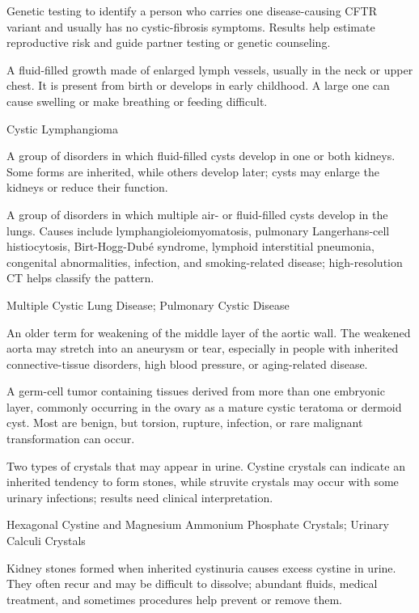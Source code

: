  Genetic testing to identify a person who carries one disease-causing CFTR variant and usually has no cystic-fibrosis symptoms. Results help estimate reproductive risk and guide partner testing or genetic counseling.

 A fluid-filled growth made of enlarged lymph vessels, usually in the neck or upper chest. It is present from birth or develops in early childhood. A large one can cause swelling or make breathing or feeding difficult.

\synonyms
Cystic Lymphangioma

 A group of disorders in which fluid-filled cysts develop in one or both kidneys. Some forms are inherited, while others develop later; cysts may enlarge the kidneys or reduce their function.

 A group of disorders in which multiple air- or fluid-filled cysts develop in the lungs. Causes include lymphangioleiomyomatosis, pulmonary Langerhans-cell histiocytosis, Birt-Hogg-Dubé syndrome, lymphoid interstitial pneumonia, congenital abnormalities, infection, and smoking-related disease; high-resolution CT helps classify the pattern.

\synonyms
Multiple Cystic Lung Disease; Pulmonary Cystic Disease

 An older term for weakening of the middle layer of the aortic wall. The weakened aorta may stretch into an aneurysm or tear, especially in people with inherited connective-tissue disorders, high blood pressure, or aging-related disease.

 A germ-cell tumor containing tissues derived from more than one embryonic layer, commonly occurring in the ovary as a mature cystic teratoma or dermoid cyst. Most are benign, but torsion, rupture, infection, or rare malignant transformation can occur.

 Two types of crystals that may appear in urine. Cystine crystals can indicate an inherited tendency to form stones, while struvite crystals may occur with some urinary infections; results need clinical interpretation.

\synonyms
Hexagonal Cystine and Magnesium Ammonium Phosphate Crystals; Urinary Calculi Crystals

 Kidney stones formed when inherited cystinuria causes excess cystine in urine. They often recur and may be difficult to dissolve; abundant fluids, medical treatment, and sometimes procedures help prevent or remove them.

